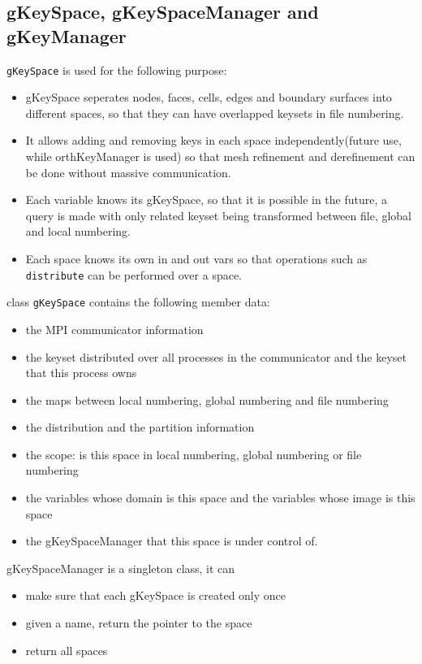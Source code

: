 \documentclass{article}
\begin{document}
\subsection{gKeySpace, gKeySpaceManager and gKeyManager}  
\texttt{gKeySpace} is used for the following purpose:
\begin{itemize} 
\item gKeySpace seperates nodes, faces, cells, edges and boundary surfaces
into different spaces, so that they can have overlapped keysets in
file numbering.
 \item It allows adding and removing keys in each space independently(future
use, while orthKeyManager is used) so that mesh refinement and
derefinement can be done without massive communication. 
\item Each variable knows its gKeySpace, so that it is possible in the
  future, a query is made with only related keyset being transformed
  between file, global and local numbering. 
\item Each space knows its own in and out vars so that operations
  such as \texttt{distribute} can be performed over a space.
  
\end{itemize}   



class \texttt{gKeySpace} contains the following member data:

\begin{itemize}
 \item the MPI communicator information
 \item the keyset distributed over all processes in the communicator and
   the keyset that
   this process owns
 \item the maps between local numbering, global numbering and file
   numbering
 \item the distribution and the partition information
 \item the scope: is this space in local numbering, global numbering
   or file numbering
 \item the variables whose domain is this space and the variables
   whose image is this space
 \item the gKeySpaceManager that this space is under control of.
 \end{itemize}

gKeySpaceManager is a singleton class, it can
\begin{itemize}
\item make sure that each gKeySpace is created only once
\item given a name, return the pointer to the space
\item return all spaces
\end{itemize}
\end{document}
